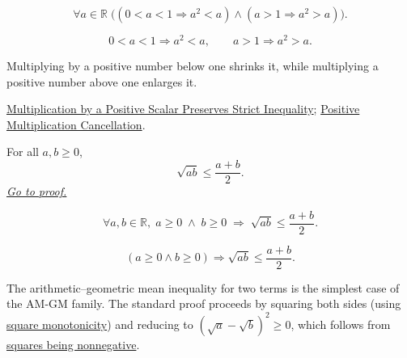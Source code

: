 \begin{remark*}
\[
\forall a\in\mathbb{R}\;
\bigl((0<a<1\Rightarrow a^2<a)\land(a>1\Rightarrow a^2>a)\bigr).
\]
\end{remark*}

\begin{remark*}
\[
0<a<1\Rightarrow a^2<a,
\qquad
a>1\Rightarrow a^2>a.
\]
\end{remark*}

\begin{remark*}[Interpretation]
Multiplying by a positive number below one shrinks it, while multiplying a
positive number above one enlarges it.
\end{remark*}

\begin{dependencies}
\hyperref[thm:ineq-multiply-positive]{Multiplication by a Positive Scalar Preserves Strict Inequality};
\hyperref[lem:positive-multiplication-cancellation]{Positive Multiplication Cancellation}.
\end{dependencies}


\begin{theorem}
\label{thm:ineq-am-gm-two}
For all $a, b \ge 0$,
\[
  \sqrt{ab} \le \frac{a + b}{2}.
\]
\hyperref[prf:ineq-am-gm-two]{\textit{Go to proof.}}
\end{theorem}



\begin{remark*}
\[
  \forall a, b \in \mathbb{R},\;
  a \ge 0 \;\land\; b \ge 0 \;\Rightarrow\;
  \sqrt{ab} \le \frac{a + b}{2}.
\]
\end{remark*}

\begin{remark*}
\[
(a\ge0\land b\ge0)\Rightarrow \sqrt{ab}\le \frac{a+b}{2}.
\]
\end{remark*}

\begin{remark*}[Interpretation]
The arithmetic--geometric mean inequality for two terms is the simplest
case of the AM-GM family.  The standard proof proceeds by squaring both
sides (using
\hyperref[thm:ineq-square-monotone]{square monotonicity}) and reducing
to $(\sqrt{a} - \sqrt{b})^2 \ge 0$, which follows from
\hyperref[prop:product-of-positives-is-positive-q]{squares being nonnegative}.
\end{remark*}

